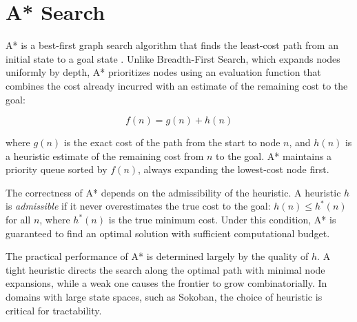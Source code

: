 \section{A* Search}

A* is a best-first graph search algorithm that finds the least-cost path from an initial state to a goal state \cite{hart1968formal}. Unlike Breadth-First Search, which expands nodes uniformly by depth, A* prioritizes nodes using an evaluation function that combines the cost already incurred with an estimate of the remaining cost to the goal:

$$f(n) = g(n) + h(n)$$

where $g(n)$ is the exact cost of the path from the start to node $n$, and $h(n)$ is a heuristic estimate of the remaining cost from $n$ to the goal. A* maintains a priority queue sorted by $f(n)$, always expanding the lowest-cost node first.

The correctness of A* depends on the admissibility of the heuristic. A heuristic $h$ is \textit{admissible} if it never overestimates the true cost to the goal: $h(n) \leq h^*(n)$ for all $n$, where $h^*(n)$ is the true minimum cost. Under this condition, A* is guaranteed to find an optimal solution with sufficient computational budget.

The practical performance of A* is determined largely by the quality of $h$. A tight heuristic directs the search along the optimal path with minimal node expansions, while a weak one causes the frontier to grow combinatorially. In domains with large state spaces, such as Sokoban, the choice of heuristic is critical for tractability.